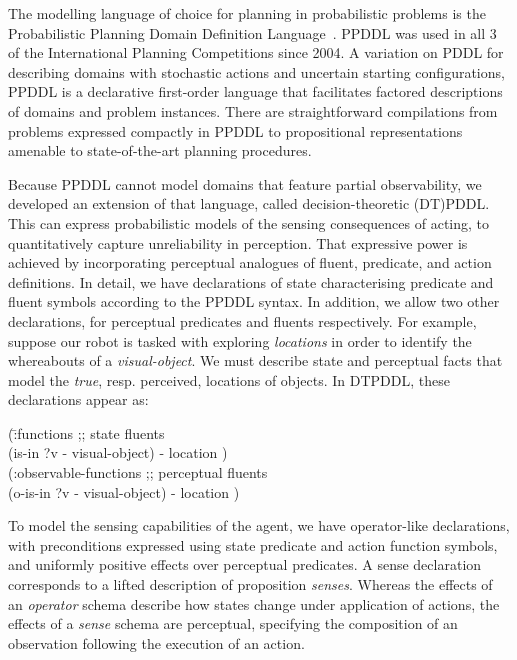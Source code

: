 
The modelling language of choice for planning in probabilistic
problems is the Probabilistic Planning Domain Definition
Language~\cite{younes:littman:04,younes:etal:2005}. PPDDL was used in
all 3 of the International Planning Competitions since 2004. A
variation on PDDL for describing domains with stochastic actions and
uncertain starting configurations, PPDDL is a declarative first-order
language that facilitates factored descriptions of domains and problem
instances. There are straightforward compilations from problems
expressed compactly in PPDDL to propositional representations amenable
to state-of-the-art planning procedures.

Because PPDDL cannot model domains that feature partial observability,
we developed an extension of that language, called decision-theoretic
(DT)PDDL. This can express probabilistic models of the sensing
consequences of acting, to quantitatively capture unreliability in
perception. That expressive power is achieved by incorporating
perceptual analogues of fluent, predicate, and action definitions. In
detail, we have declarations of state characterising predicate and
fluent symbols according to the PPDDL syntax. In addition, we allow
two other declarations, for perceptual predicates and fluents
respectively. For example, suppose our robot is tasked with exploring
{\em locations} in order to identify the whereabouts of a {\em
visual-object}. We must describe state and perceptual facts that model
the {\em true}, resp. perceived, locations of objects. In DTPDDL,
these declarations appear as:

\small
\begin{tabtt}
(\=:functions  ;; state fluents\\
  \> (is-in ?v - visual-object) - location )\\
(:observable-functions  ;; perceptual fluents\\
  \> (o-is-in ?v - visual-object) - location )
\end{tabtt}
\normalsize

\noindent To model the sensing capabilities of the agent, we have
operator-like declarations, with preconditions expressed using state
predicate and action function symbols, and uniformly positive effects
over perceptual predicates. A sense declaration corresponds to a
lifted description of proposition {\em senses}. Whereas the effects of
an {\em operator} schema describe how states change under application
of actions, the effects of a {\em sense} schema are perceptual,
specifying the composition of an observation following the execution
of an action. 

